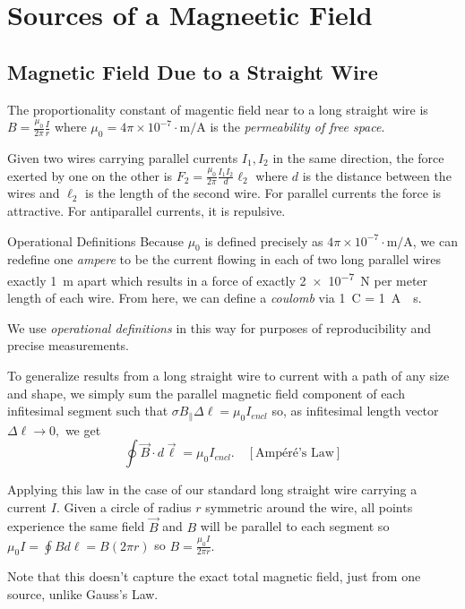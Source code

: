 \chapter{Sources of a Magneetic Field}

\section{Magnetic Field Due to a Straight Wire}

\begin{definition}
    The proportionality constant of magentic field near to a long straight wire is $B = \frac{\mu_0}{2\pi}\frac{I}{r}$ where $\mu_0 = 4\pi\times10^{-7}\cdot\text{m/A}$ is the \emph{permeability of free space}.
\end{definition}
\begin{remark}
    Given two wires carrying parallel currents $I_1, I_2$ in the same direction, the force exerted by one on the other is $F_2 = \frac{\mu_0}{2\pi}\frac{I_1I_2}{d}\ell_2$ where $d$ is the distance between the wires and $\ell_2$ is the length of the second wire. For parallel currents the force is attractive. For antiparallel currents, it is repulsive. 
\end{remark}
\begin{remark}{Operational Definitions}
    Because $\mu_0$ is defined precisely as $4\pi\times10^{-7}\cdot\text{m/A}$, we can redefine one \emph{ampere} to be the current flowing in each of two long parallel wires exactly \qty{1}{m} apart which results in a force of exactly \qty{2e-7}{N} per meter length of each wire. From here, we can define a \emph{coulomb} via \qty{1}{C} = \qty{1}{A\cdot s}.

    We use \emph{operational definitions} in this way for purposes of reproducibility and precise measurements.
\end{remark}
\begin{remark}
    To generalize results from a long straight wire to current with a path of any size and shape, we simply sum the parallel magnetic field component of each infitesimal segment such that $\sigma B_\parallel\Delta\ell = \mu_0I_{encl}$ so, as infitesimal length vector $\Delta\ell\to0,$ we get $$\oint\vec{B}\cdot d\vec{\ell} = \mu_0I_{encl}. \quad [\text{Ampéré's Law}]$$
\end{remark}
\begin{example}
    Applying this law in the case of our standard long straight wire carrying a current $I$. Given a circle of radius $r$ symmetric around the wire, all points experience the same field $\vec{B}$ and $B$ will be parallel to each segment so $\mu_0I = \oint Bd\ell = B(2\pi r)$ so $B = \frac{\mu_0I}{2\pi r}.$
\end{example}
\begin{note}
    Note that this doesn't capture the exact total magnetic field, just from one source, unlike Gauss's Law.
\end{note}

